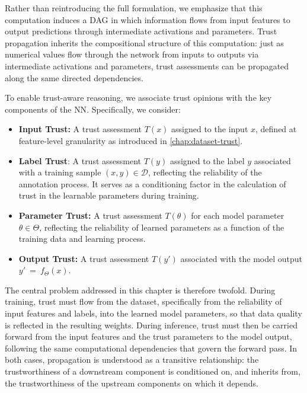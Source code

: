 Rather than reintroducing the full formulation, we emphasize that this computation induces a \ac{DAG} in which information flows from input features to output predictions through intermediate activations and parameters. Trust propagation inherits the compositional structure of this computation: just as numerical values flow through the network from inputs to outputs via intermediate activations and parameters, trust assessments can be propagated along the same directed dependencies.

To enable trust-aware reasoning, we associate trust opinions with the key components of the \ac{NN}. Specifically, we consider:
\begin{itemize}
    \item \textbf{Input Trust:} A trust assessment $T(x)$ assigned to the input $x$, defined at feature-level granularity as introduced in \cref{chap:dataset-trust}.

    \item \textbf{Label Trust}: A trust assessment $T(y)$  assigned to the label $y$ associated with a training sample $(x,y) \in \mathcal{D}$, reflecting the reliability of the annotation process. It serves as a conditioning factor in the calculation of trust in the learnable parameters during training.

    \item \textbf{Parameter Trust:} A trust assessment $T(\theta)$ for each model parameter $\theta \in \Theta$, reflecting the reliability of learned parameters as a function of the training data and learning process.
    
    \item \textbf{Output Trust:} A trust assessment $T(y')$ associated with the model output $y'~=~f_\Theta(x)$.
\end{itemize}

\noindent The central problem addressed in this chapter is therefore twofold. During training, trust must flow from the dataset, specifically from the reliability of input features and labels, into the learned model parameters, so that data quality is reflected in the resulting weights. During inference, trust must then be carried forward from the input features and the trust parameters to the model output, following the same computational dependencies that govern the forward pass. In both cases, propagation is understood as a transitive relationship: the trustworthiness of a downstream component is conditioned on, and inherits from, the trustworthiness of the upstream components on which it depends.

